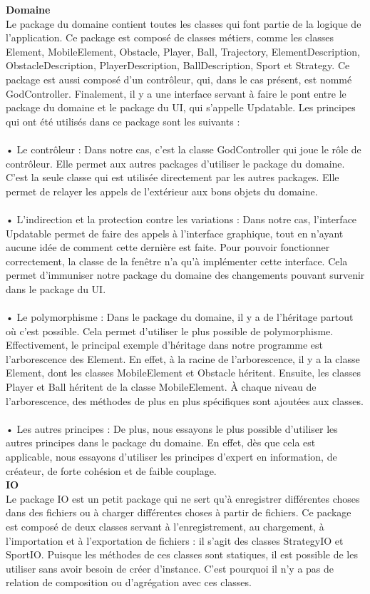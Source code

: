 \textbf{Domaine}\\
Le package du domaine contient toutes les classes qui font partie de la logique de l’application. Ce package est composé de classes métiers, comme les classes Element, MobileElement, Obstacle, Player, Ball, Trajectory, ElementDescription, ObstacleDescription, PlayerDescription, BallDescription, Sport et Strategy. Ce package est aussi composé d’un contrôleur, qui, dans le cas présent, est nommé GodController. Finalement, il y a une interface servant à faire le pont entre le package du domaine et le package du UI, qui s’appelle Updatable. Les principes qui ont été utilisés dans ce package sont les suivants :\\
\\•	Le contrôleur : Dans notre cas, c’est la classe GodController qui joue le rôle de contrôleur. Elle permet aux autres packages d’utiliser le package du domaine. C’est la seule classe qui est utilisée directement par les autres packages. Elle permet de relayer les appels de l’extérieur aux bons objets du domaine.\\
\\•	L’indirection et la protection contre les variations : Dans notre cas, l’interface Updatable permet de faire des appels à l’interface graphique, tout en n’ayant aucune idée de comment cette dernière est faite. Pour pouvoir fonctionner correctement, la classe de la fenêtre n’a qu’à implémenter cette interface. Cela permet d’immuniser notre package du domaine des changements pouvant survenir dans le package du UI.\\
\\•	Le polymorphisme : Dans le package du domaine, il y a de l’héritage partout où c’est possible. Cela permet d’utiliser le plus possible de polymorphisme. Effectivement, le principal exemple d’héritage dans notre programme est l’arborescence des Element. En effet, à la racine de l’arborescence, il y a la classe Element, dont les classes MobileElement et Obstacle héritent. Ensuite, les classes Player et Ball héritent de la classe MobileElement. À chaque niveau de l’arborescence, des méthodes de plus en plus spécifiques sont ajoutées aux classes.\\
\\•	Les autres principes : De plus, nous essayons le plus possible d’utiliser les autres principes dans le package du domaine. En effet, dès que cela est applicable, nous essayons d’utiliser les principes d’expert en information, de créateur, de forte cohésion et de faible couplage.\\

\textbf{IO}\\
Le package IO est un petit package qui ne sert qu’à enregistrer différentes choses dans des fichiers ou à charger différentes choses à partir de fichiers. Ce package est composé de deux classes servant à l’enregistrement, au chargement, à l’importation et à l’exportation de fichiers : il s’agit des classes StrategyIO et SportIO. Puisque les méthodes de ces classes sont statiques, il est possible de les utiliser sans avoir besoin de créer d’instance. C’est pourquoi il n’y a pas de relation de composition ou d’agrégation avec ces classes.
